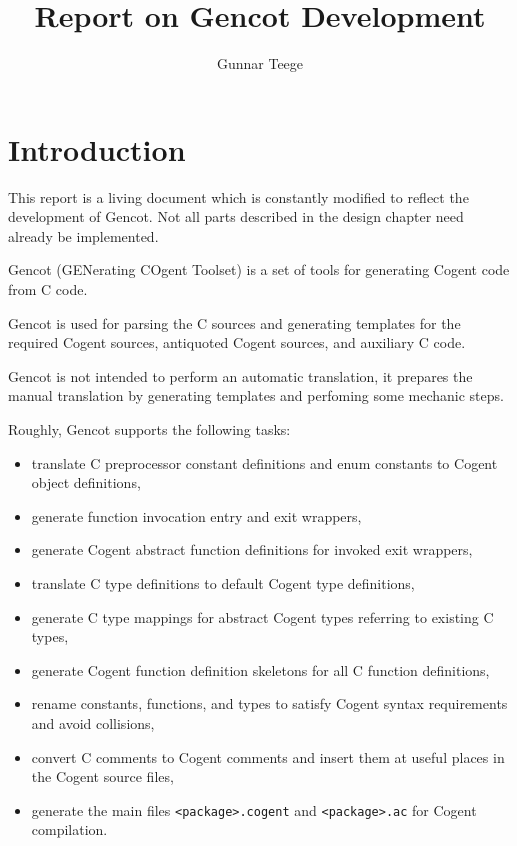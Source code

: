 \documentclass[a4paper]{report}
\newcommand{\code}[1]{\textnormal{\texttt{#1}}}
\begin{document}
\title{Report on Gencot Development}
\author{Gunnar Teege}

\maketitle

\chapter{Introduction}

This report is a living document which is constantly modified to reflect the development of Gencot. 
Not all parts described in the design chapter need already be implemented.

Gencot (GENerating COgent Toolset) is a set of tools for generating Cogent code from C code. 

Gencot is used for parsing the C sources and generating templates for the required Cogent sources, 
antiquoted Cogent sources, and auxiliary C code. 

Gencot is not intended to perform an automatic translation, it prepares the manual translation by 
generating templates and perfoming some mechanic steps.

Roughly, Gencot supports the following tasks:
\begin{itemize}
\item translate C preprocessor constant definitions and enum constants to Cogent object definitions,
\item generate function invocation entry and exit wrappers,
\item generate Cogent abstract function definitions for invoked exit wrappers,
\item translate C type definitions to default Cogent type definitions,
\item generate C type mappings for abstract Cogent types referring to existing C types,
\item generate Cogent function definition skeletons for all C function definitions,
\item rename constants, functions, and types to satisfy Cogent syntax requirements and avoid collisions,
\item convert C comments to Cogent comments and insert them at useful places in the Cogent source files,
\item generate the main files \code{<package>.cogent} and \code{<package>.ac} for Cogent compilation.
\end{itemize}
\end{document}
